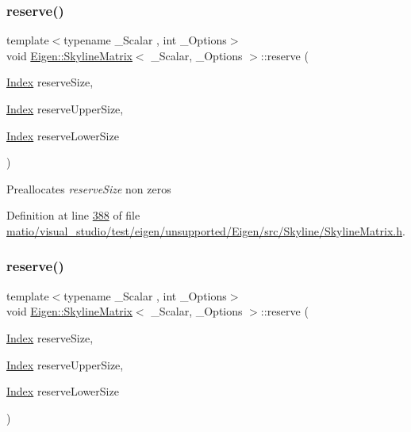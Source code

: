 \subsubsection{\texorpdfstring{reserve()}{reserve()}\hspace{0.1cm}{\footnotesize\ttfamily [1/2]}}
{\footnotesize\ttfamily template$<$typename \+\_\+\+Scalar , int \+\_\+\+Options$>$ \\
void \hyperlink{class_eigen_1_1_skyline_matrix}{Eigen\+::\+Skyline\+Matrix}$<$ \+\_\+\+Scalar, \+\_\+\+Options $>$\+::reserve (\begin{DoxyParamCaption}\item[{\hyperlink{group___core___module_a554f30542cc2316add4b1ea0a492ff02}{Index}}]{reserve\+Size,  }\item[{\hyperlink{group___core___module_a554f30542cc2316add4b1ea0a492ff02}{Index}}]{reserve\+Upper\+Size,  }\item[{\hyperlink{group___core___module_a554f30542cc2316add4b1ea0a492ff02}{Index}}]{reserve\+Lower\+Size }\end{DoxyParamCaption})\hspace{0.3cm}{\ttfamily [inline]}}

Preallocates {\itshape reserve\+Size} non zeros 

Definition at line \hyperlink{matio_2visual__studio_2test_2eigen_2unsupported_2_eigen_2src_2_skyline_2_skyline_matrix_8h_source_l00388}{388} of file \hyperlink{matio_2visual__studio_2test_2eigen_2unsupported_2_eigen_2src_2_skyline_2_skyline_matrix_8h_source}{matio/visual\+\_\+studio/test/eigen/unsupported/\+Eigen/src/\+Skyline/\+Skyline\+Matrix.\+h}.

\mbox{\label{class_eigen_1_1_skyline_matrix_aac6da20a87fca9d4cb6b871504497577}} 
\subsubsection{\texorpdfstring{reserve()}{reserve()}\hspace{0.1cm}{\footnotesize\ttfamily [2/2]}}
{\footnotesize\ttfamily template$<$typename \+\_\+\+Scalar , int \+\_\+\+Options$>$ \\
void \hyperlink{class_eigen_1_1_skyline_matrix}{Eigen\+::\+Skyline\+Matrix}$<$ \+\_\+\+Scalar, \+\_\+\+Options $>$\+::reserve (\begin{DoxyParamCaption}\item[{\hyperlink{group___core___module_a554f30542cc2316add4b1ea0a492ff02}{Index}}]{reserve\+Size,  }\item[{\hyperlink{group___core___module_a554f30542cc2316add4b1ea0a492ff02}{Index}}]{reserve\+Upper\+Size,  }\item[{\hyperlink{group___core___module_a554f30542cc2316add4b1ea0a492ff02}{Index}}]{reserve\+Lower\+Size }\end{DoxyParamCaption})\hspace{0.3cm}{\ttfamily [inline]}}


